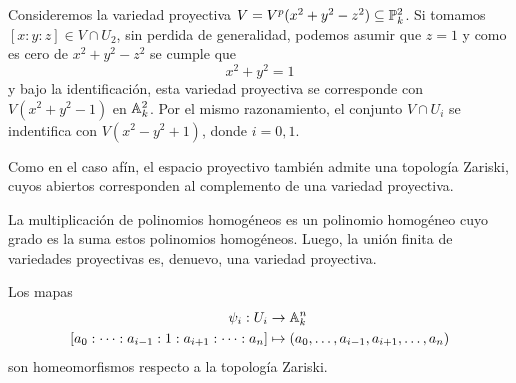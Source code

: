\documentclass[11pt]{article}
\begin{document}
\begin{ejm}
    Consideremos la variedad proyectiva $V=V^{p}(x^{2}+y^{2}-z^{2})\subseteq\P_{k}^{2}$. Si 
    tomamos $[x:y:z]\in V\cap U_{2}$, sin perdida de generalidad, podemos asumir que $z=1$ y como 
    es cero de $x^{2}+y^{2}-z^{2}$ se cumple que
    \begin{equation*}
        x^{2}+y^{2}=1
    \end{equation*}
    y bajo la identificación, esta variedad proyectiva se corresponde con $V(x^{2}+y^{2}-1)$ en 
    $\A_{k}^{2}$. Por el mismo razonamiento, el conjunto $V\cap U_{i}$ se indentifica con 
    $V(x^{2}-y^{2}+1)$, donde $i=0,1$.
\end{ejm}

\noindent Como en el caso afín, el espacio proyectivo también admite una topología Zariski, cuyos 
abiertos corresponden al complemento de una variedad proyectiva.

\vspace{1mm}
\obs La multiplicación de polinomios homogéneos es un polinomio homogéneo cuyo grado es la suma 
estos polinomios homogéneos. Luego, la unión finita de variedades proyectivas es, denuevo, una 
variedad proyectiva.

\begin{prop}
    Los mapas
    \begin{align*}
        \psi_{i}:U_{i} &\to \A_{k}^{n} \\
        [a_{0}:\dots:a_{i-1}:1:a_{i+1}:\dots:a_{n}] &\mapsto 
        (a_{0},\dots,a_{i-1},a_{i+1},\dots,a_{n})
    \end{align*}
    son homeomorfismos respecto a la topología Zariski.
\end{prop}
\end{document}
